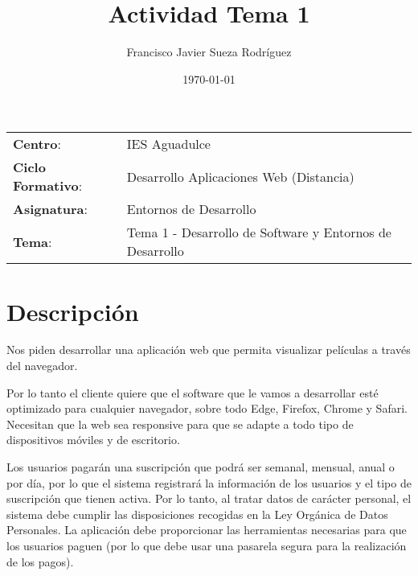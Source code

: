 


\title{
\normalfont \normalsize
\huge \textbf{Actividad Tema 1}
}
\author{Francisco Javier Sueza Rodríguez}
\date{\normalsize\today}



\maketitle

\vspace{2ex}

\begin{center}
    \begin{tabular}{l l}
        \textbf{Centro}: & IES Aguadulce \\
        \textbf{Ciclo Formativo}: & Desarrollo Aplicaciones Web (Distancia)\\
        \textbf{Asignatura}: & Entornos de Desarrollo\\
        \textbf{Tema}: & Tema 1 - Desarrollo de Software y Entornos de Desarrollo \\
    \end{tabular}
\end{center}

\vspace{10ex}

\section{Descripción}
Nos piden desarrollar una aplicación web que permita visualizar películas a través del navegador.

Por lo tanto el cliente quiere que el software que le vamos a desarrollar esté optimizado para cualquier navegador, sobre todo Edge, Firefox, Chrome y Safari. Necesitan que la web sea responsive para que se adapte a todo tipo de dispositivos móviles y de escritorio.

Los usuarios pagarán una suscripción que podrá ser semanal, mensual, anual o por día, por lo que el sistema registrará la información de los usuarios y el tipo de suscripción que tienen activa. Por lo tanto, al tratar datos de carácter personal, el sistema debe cumplir las disposiciones recogidas en la Ley Orgánica de Datos Personales. La aplicación debe proporcionar las herramientas necesarias para que los usuarios paguen (por lo que debe usar una pasarela segura para la realización de los pagos).

